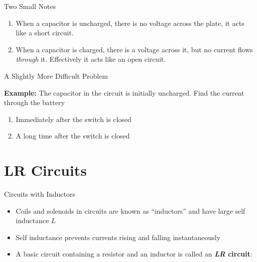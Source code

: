 \documentclass[12pt,aspectratio=169]{beamer}
\begin{document}
\begin{frame}{Two Small Notes}
  \begin{enumerate}
  \item When a capacitor is uncharged, there is no voltage across the plate,
    it acts like a short circuit.
  \item When a capacitor is charged, there is a voltage across it, but no
    current flows \emph{through} it. Effectively it acts like an open circuit.
  \end{enumerate}
\end{frame}



\begin{frame}{A Slightly More Difficult Problem}
  \begin{center}
  \end{center}
  \textbf{Example:} The capacitor in the circuit is initially uncharged. Find
  the current through the battery
  \begin{enumerate}
  \item Immediately after the switch is closed
  \item A long time after the switch is closed
  \end{enumerate}
\end{frame}


\section{LR Circuits}

\begin{frame}{Circuits with Inductors}
  \begin{itemize}
  \item Coils and solenoids in circuits are known as ``inductors'' and have
    large self inductance $L$
  \item Self inductance prevents currents rising and falling instantaneously
  \item A basic circuit containing a resistor and an inductor is called an
    \textbf{\emph{LR} circuit}:
    \begin{center}
    \end{center}
  \end{itemize}
\end{frame}
\end{document}
